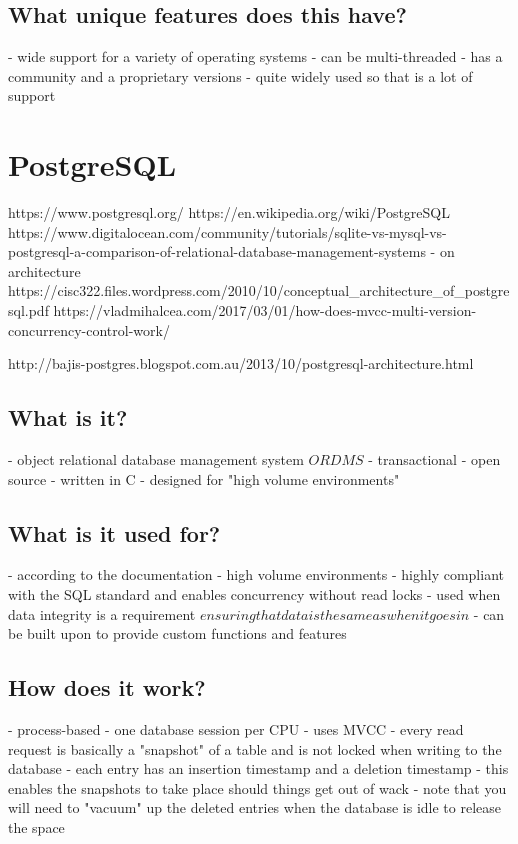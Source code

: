 \section{What unique features does this have?}
- wide support for a variety of operating systems
- can be multi-threaded
- has a community and a proprietary versions
- quite widely used so that is a lot of support

\chapter{PostgreSQL}
https://www.postgresql.org/
https://en.wikipedia.org/wiki/PostgreSQL
https://www.digitalocean.com/community/tutorials/sqlite-vs-mysql-vs-postgresql-a-comparison-of-relational-database-management-systems
- on architecture
https://cisc322.files.wordpress.com/2010/10/conceptual_architecture_of_postgresql.pdf
https://vladmihalcea.com/2017/03/01/how-does-mvcc-multi-version-concurrency-control-work/

http://bajis-postgres.blogspot.com.au/2013/10/postgresql-architecture.html

\section{What is it?}
- object relational database management system \(ORDMS\)
- transactional
- open source
- written in C
- designed for "high volume environments"

\section{What is it used for?}
- according to the documentation - high volume environments
- highly compliant with the SQL standard and enables concurrency without read locks
- used when data integrity is a requirement \(ensuring that data is the same as when it goes in\)
- can be built upon to provide custom functions and features

\section{How does it work?}
- process-based - one database session per CPU
- uses MVCC - every read request is basically a "snapshot" of a table and is not locked when writing to the database
- each entry has an insertion timestamp and a deletion timestamp - this enables the snapshots to take place should things get out of wack
- note that you will need to "vacuum" up the deleted entries when the database is idle to release the space

